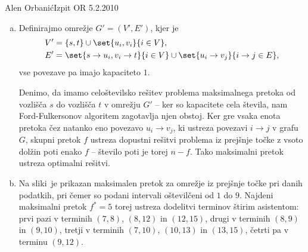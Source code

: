 \begin{naloga}{Alen Orbanić}{Izpit OR 5.2.2010}
\begin{odgovor}
\begin{enumerate}[(a)]
\item Definirajmo omrežje $G' = (V', E')$,
kjer je
\begin{align*}
V' &= \{s, t\} \cup \set{u_i, v_i}{i \in V}, \\
E' &= \set{s \to u_i, v_i \to t}{i \in V}
 \cup \set{u_i \to v_j}{i \to j \in E},
\end{align*}
vse povezave pa imajo kapaciteto $1$.

Denimo,
da imamo celoštevilsko rešitev problema maksimalnega pretoka
od vozlišča $s$ do vozlišča $t$ v omrežju $G'$
-- ker so kapacitete cela števila,
nam Ford-Fulkersonov algoritem zagotavlja njen obstoj.
Ker gre vsaka enota pretoka čez natanko eno povezavo $u_i \to v_j$,
ki ustreza povezavi $i \to j$ v grafu $G$,
skupni pretok $f$ ustreza dopustni rešitvi problema iz prejšnje točke
z vsoto dolžin poti enako $f$
-- število poti je torej $n-f$.
Tako maksimalni pretok ustreza optimalni rešitvi.

\item Na sliki~\fig je prikazan maksimalen pretok
za omrežje iz prejšnje točke pri danih podatkih,
pri čemer so podani intervali oštevilčeni od $1$ do $9$.
Najdeni maksimalni pretok $f^* = 5$
torej ustreza dodelitvi terminov štirim asistentom:
prvi pazi v terminih $(7, 8)$, $(8, 12)$ in $(12, 15)$,
drugi v terminih $(8, 9)$ in $(9, 10)$,
tretji v terminih $(7, 10)$, $(10, 13)$ in $(13, 15)$,
četrti pa v terminu $(9, 12)$.
\end{enumerate}

\begin{slika}
\pgfslika
{}
\end{slika}
\end{odgovor}
\end{naloga}
